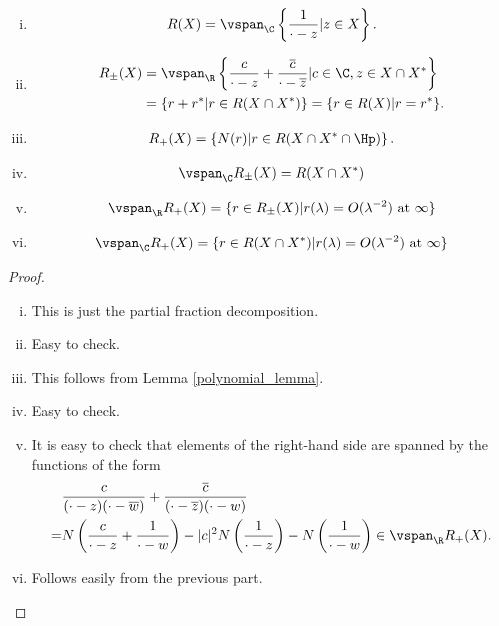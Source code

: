\begin{prop}\label{pick_functional_span}
	\begin{enumerate}[(i)]
		\item
		\begin{align*}
			R(X) = \vspan_{\C} \left\{\frac{1}{\cdot - z} | z \in X \right\}.
		\end{align*}
		\item
		\begin{align*}
			R_{\pm}(X) &= \vspan_{\R} \left\{\frac{c}{\cdot - z} + \frac{\overline{c}}{\cdot - \overline{z}} | c \in \C, z \in X \cap X^{*} \right\} \\
			&= \{r + r^{*} | r \in R(X \cap X^{*}) \} = \{r \in R(X) | r = r^{*}\}.
		\end{align*}
		\item
		\begin{align*}
			R_{+}(X) = \left\{ N(r) | r \in R(X \cap X^{*} \cap \Hp) \right\}.
		\end{align*}
		\item
		\begin{align*}
			\vspan_{\C} R_{\pm}(X) = R(X \cap X^{*})
		\end{align*}
		\item
		\begin{align*}
			\vspan_{\R} R_{+}(X) = \{r \in R_{\pm}(X) | r(\lambda) = O(\lambda^{-2}) \text{ at }\infty\}
		\end{align*}
		\item
		\begin{align*}
			\vspan_{\C} R_{+}(X) = \{r \in R(X \cap X^{*}) | r(\lambda) = O(\lambda^{-2}) \text{ at }\infty\}
		\end{align*}
	\end{enumerate}
\end{prop}
\begin{proof}
	\begin{enumerate}[(i)]
		\item This is just the partial fraction decomposition.
		\item Easy to check.
		\item This follows from Lemma \ref{polynomial_lemma}.
		\item Easy to check.
		\item It is easy to check that elements of the right-hand side are spanned by the functions of the form
		\begin{align*}
			&\frac{c}{(\cdot - z)(\cdot - \overline{w})} + \frac{\overline{c}}{(\cdot - \overline{z})(\cdot - w)} \\
			=& N\left(\frac{c}{\cdot - z} + \frac{1}{\cdot - w}\right) - |c|^2 N\left(\frac{1}{\cdot - z}\right) - N\left(\frac{1}{\cdot - w}\right) \in \vspan_{\R} R_{+}(X).
		\end{align*}
		\item Follows easily from the previous part.
	\end{enumerate}
\end{proof}

